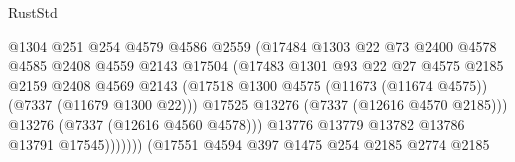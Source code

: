 \begin{lexlean}{RustStd}
\begin{coremodule}
                                          @1304
                                          @251
                                          @254
                                          @4579
                                          @4586
                                          @2559
                                          (@17484
                                            @1303
                                            @22
                                            @73
                                            @2400
                                            @4578
                                            @4585
                                            @2408
                                            @4559
                                            @2143
                                            @17504
                                            (@17483
                                              @1301
                                              @93
                                              @22
                                              @27
                                              @4575
                                              @2185
                                              @2159
                                              @2408
                                              @4569
                                              @2143
                                              (@17518
                                                @1300
                                                @4575
                                                (@11673 (@11674 @4575))
                                                (@7337 (@11679 @1300 @22)))
                                              @17525
                                              @13276
                                              (@7337 (@12616 @4570 @2185)))
                                            @13276
                                            (@7337 (@12616 @4560 @4578)))
                                          @13776
                                          @13779
                                          @13782
                                          @13786
                                          @13791
                                          @17545)))))))
                            (@17551
                              @4594
                              @397
                              @1475
                              @254
                              @2185
                              @2774
                              @2185

\end{coremodule}
\end{lexlean}
